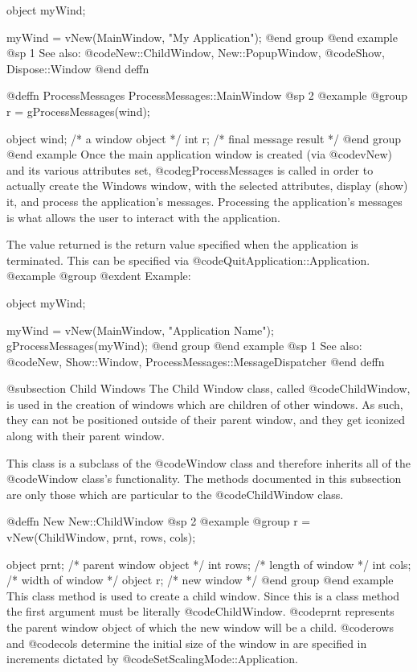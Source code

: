 object  myWind;

myWind = vNew(MainWindow, "My Application");
@end group
@end example
@sp 1
See also:  @code{New::ChildWindow, New::PopupWindow,}
      @code{Show, Dispose::Window}
@end deffn







@deffn {ProcessMessages} ProcessMessages::MainWindow
@sp 2
@example
@group
r = gProcessMessages(wind);

object  wind;   /*  a window object       */
int     r;      /*  final message result  */
@end group
@end example
Once the main application window is created (via @code{vNew}) and
its various attributes set, @code{gProcessMessages} is called in order
to actually create the Windows window, with the selected attributes,
display (show) it, and process the application's messages.  Processing
the application's messages is what allows the user to interact with the
application.

The value returned is the return value specified when the application is
terminated.  This can be specified via @code{QuitApplication::Application}.
@example
@group
@exdent Example:

object  myWind;

myWind = vNew(MainWindow, "Application Name");
gProcessMessages(myWind);
@end group
@end example
@sp 1
See also:  @code{New, Show::Window, ProcessMessages::MessageDispatcher}
@end deffn











@subsection Child Windows
The Child Window class, called @code{ChildWindow}, is used in the creation
of windows which are children of other windows.  As such, they can not
be positioned outside of their parent window, and they get iconized along
with their parent window.


This class is a subclass of the @code{Window} class and therefore
inherits all of the @code{Window} class's functionality.  The methods
documented in this subsection are only those which are particular
to the @code{ChildWindow} class.





@deffn {New} New::ChildWindow
@sp 2
@example
@group
r = vNew(ChildWindow, prnt, rows, cols);

object  prnt;   /*  parent window object  */
int     rows;   /*  length of window      */
int     cols;   /*  width of window       */
object  r;      /*  new window            */
@end group
@end example
This class method is used to create a child window.
Since this is a class method the first argument must be literally
@code{ChildWindow}.  @code{prnt} represents the parent window
object of which the new window will be a child.  @code{rows} and
@code{cols} determine the initial size of the window in are specified
in increments dictated by @code{SetScalingMode::Application}.

